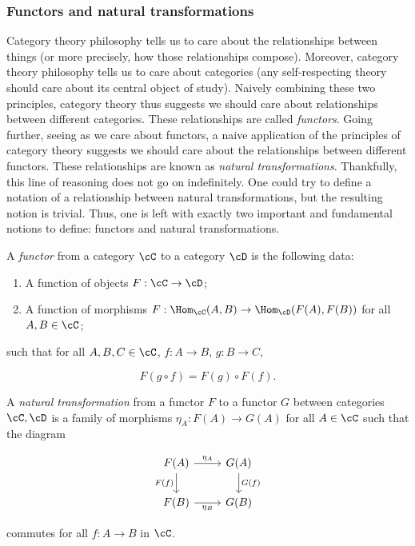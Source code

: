 \subsubsection{Functors and natural transformations}

Category theory philosophy tells us to care about the relationships between things (or more precisely, how those relationships compose). Moreover, category theory philosophy tells us to care about categories (any self-respecting theory should care about its central object of study). Naively combining these two principles, category theory thus suggests we should care about relationships between different categories. These relationships are called {\em functors}. Going further, seeing as we care about functors, a naive application of the principles of category theory suggests we should care about the relationships between different functors. These relationships are known as {\em natural transformations}. Thankfully, this line of reasoning does not go on indefinitely. One could try to define a notation of a relationship between natural transformations, but the resulting notion is trivial. Thus, one is left with exactly two important and fundamental notions to define: functors and natural transformations.

\begin{defn}[Functor] A {\em functor} from a category $\cC$ to a category $\cD$ is the following data:

\begin{enumerate}
\item A function of objects $ F:\cC\to\cD$;
\item A function of morphisms $F:\Hom_{\cC}(A,B)\to \Hom_{\cD}(F(A),F(B))$ for all $A,B\in \cC$;
\end{enumerate}

such that for all $A,B,C\in \cC$, $f:A\to B$, $g:B\to C$,

$$F(g\circ f)=F(g)\circ F(f).$$
\end{defn}

\begin{defn} A {\em natural transformation} from a functor $F$ to a functor $G$ between categories $\cC,\cD$ is a family of morphisms $\eta_A:F(A)\to G(A)$ for all $A\in \cC$ such that the diagram

\[\begin{tikzcd}
	{F(A)} & {G(A)} \\
	{F(B)} & {G(B)}
	\arrow["{\eta_A}", from=1-1, to=1-2]
	\arrow["{F(f)}"', from=1-1, to=2-1]
	\arrow["{G(f)}", from=1-2, to=2-2]
	\arrow["{\eta_B}"', from=2-1, to=2-2]
\end{tikzcd}\]

commutes for all $f:A\to B$ in $\cC$.
\end{defn}

